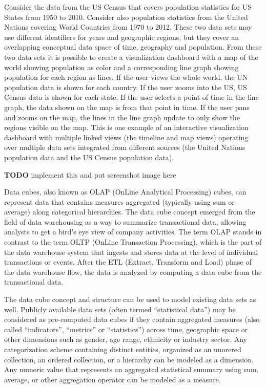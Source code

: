 \documentclass[12pt]{article}
\newcommand{\TODO}[1]{{ \color{red}\textbf{TODO} #1 }}
\begin{document}
\begin{doublespace}
Consider the data from the US Census that covers population statistics for US States from 1950 to 2010. Consider also population statistics from the United Nations covering World Countries from 1970 to 2012. These two data sets may use different identifiers for years and geographic regions, but they cover an overlapping conceptual data space of time, geography and population. From these two data sets it is possible to create a visualization dashboard with a map of the world showing population as color and a corresponding line graph showing population for each region as lines. If the user views the whole world, the UN population data is shown for each country. If the user zooms into the US, US Census data is shown for each state. If the user selects a point of time in the line graph, the data shown on the map is from that point in time. If the user pans and zooms on the map, the lines in the line graph update to only show the regions visible on the map. This is one example of an interactive visualization dashboard with multiple linked views (the timeline and map views) operating over multiple data sets integrated from different sources (the United Nations population data and the US Census population data).

\TODO{implement this and put screenshot image here}

Data cubes, also known as OLAP (OnLine Analytical Processing) cubes, can represent data that contains measures aggregated (typically using sum or average) along categorical hierarchies. The data cube concept emerged from the field of data warehousing as a way to summarize transactional data, allowing analysts to get a bird's eye view of company activities. The term OLAP stands in contrast to the term OLTP (OnLine Transaction Processing), which is the part of the data warehouse system that ingests and stores data at the level of individual transactions or events. After the ETL (Extract, Transform and Load) phase of the data warehouse flow, the data is analyzed by computing a data cube from the transactional data.

The data cube concept and structure can be used to model existing data sets as well. Publicly available data sets (often termed ``statistical data'') may be considered as pre-computed data cubes if they contain aggregated measures (also called ``indicators'', ``metrics'' or ``statistics'') across time, geographic space or other dimensions such as gender, age range, ethnicity or industry sector. Any categorization scheme containing distinct entities, organized as an unorered collection, an ordered collection, or a hierarchy can be modeled as a dimension. Any numeric value that represents an aggregated statistical summary using sum, average, or other aggregation operator can be modeled as a measure.


\end{doublespace}
\end{document}
